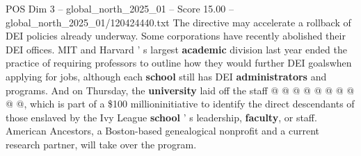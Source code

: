 \begin{textsample}{POS Dim 3 – global\_north\_2025\_01 – Score 15.00 – global\_north\_2025\_01/120424440.txt}
The directive may accelerate a rollback of DEI policies already underway.
Some corporations have recently abolished their DEI offices.
MIT and Harvard ' s largest \textbf{academic} division last year ended the practice of requiring professors to outline how they would further DEI goalswhen applying for jobs, although each \textbf{school} still has DEI \textbf{administrators} and programs.
And on Thursday, the \textbf{university} laid off the staff @ @ @ @ @ @ @ @ @ @, which is part of a \$100 millioninitiative to identify the direct descendants of those enslaved by the Ivy League \textbf{school} ' s leadership, \textbf{faculty}, or staff.
American Ancestors, a Boston-based genealogical nonprofit and a current research partner, will take over the program.

\end{textsample}
